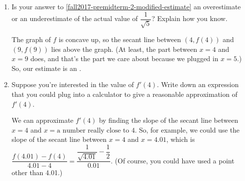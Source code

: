 \documentclass{article}
\providecommand{\check}{}
\renewcommand{\check}{\ifmmode{\text{ \ding{51} }}\else{\ding{51} }\fi}
\newenvironment{checkanswer}{\color{checkcolor}\check}{\color{black}}
\theoremstyle{theorem}
\begin{document}
\begin{enumerate}
\begin{enumerate}
    \begin{solution}
      We want to approximate $f(5)$, so let's find 2 numbers near 5 where $f$ is easy to evaluate. The closest are 4 and 9, so we'll find the secant line between $(4, f(4))$ and $(9, f(9))$. The slope of this secant line is $\displaystyle \frac{f(9)-f(4)}{9-4}=\frac{\frac{1}{3}-\frac{1}{2}}{5} = - \dfrac{1}{30}$.

      \begin{checkanswer}
        This seems reasonable based on the picture, which shows the secant line should have a negative slope that's close to 0.
      \end{checkanswer}

      Since $\left(4, \frac{1}{2} \right)$ is a point on the secant line, the secant line has equation $\displaystyle y-\frac{1}{2}=-\frac{1}{30}(x-4)$, or $\displaystyle y = -\frac{1}{30}(x-4) + \frac{1}{2}$. Therefore, the height of the secant line when $x = 5$ is $\displaystyle -\frac{1}{30}(5-4) + \frac{1}{2} = \frac{1}{2} - \frac{1}{30} = \boxed{\frac{7}{15}}$.       
    \end{solution}

  \item
    \begin{problem}[\stretch{0.25}]
      Is your answer to \ref{fall2017-premidterm-2-modified-estimate} an overestimate or an underestimate of the actual value of $\dfrac{1}{\sqrt{5}}$? Explain how you know.
    \end{problem}

    \begin{solution}
      The graph of $f$ is concave up, so the secant line between $(4, f(4))$ and $(9, f(9))$ lies above the graph. (At least, the part between $x = 4$ and $x = 9$ does, and that's the part we care about because we plugged in $x = 5$.) So, our estimate is an . 
    \end{solution}

  \item %

    \begin{problem}[\nstretch{0.25}]
      Suppose you're interested in the value of $f'(4)$. Write down an expression that you could plug into a calculator to give a reasonable approximation of $f'(4)$. 
    \end{problem}

    \begin{solution}
      We can approximate $f'(4)$ by finding the slope of the secant line between $x = 4$ and $x = \text{a number really close to 4}$. So, for example, we could use the slope of the secant line between $x = 4$ and $x = 4.01$, which is $\dfrac{f(4.01) - f(4)}{4.01 - 4} = \boxed{\dfrac{\dfrac{1}{\sqrt{4.01}} - \dfrac{1}{2}}{0.01}}$. (Of course, you could have used a point other than 4.01.) 
    \end{solution}


\end{enumerate}
\end{enumerate}
\end{document}
